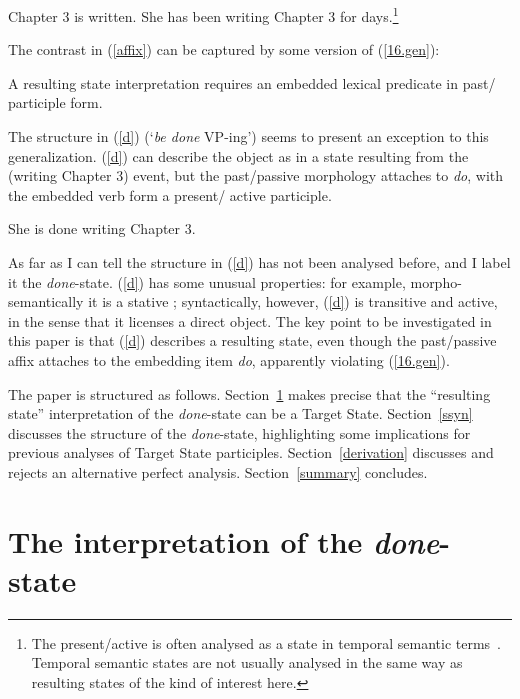 \documentclass[output=paper,modfonts,nonflat]{langsci/langscibook}
\begin{document}
\begin{exe}
\ex\label{affix}
    \begin{xlist}
    \ex Chapter 3 is written.
    \ex She has been writing Chapter 3 for days.\footnote{The present/active is often analysed as a state in temporal semantic terms~\citep[e.g.\ ][]{Parsons1990a}. Temporal semantic states are not usually analysed in the same way as resulting states of the kind of interest here.}
    \end{xlist}
\end{exe}

The contrast in (\ref{affix}) can be captured by some version of (\ref{16.gen}):

\begin{exe}
\ex\label{16.gen}  A resulting state interpretation requires an embedded lexical predicate in past/  participle form.
\end{exe}

The structure in (\ref{d}) (`\emph{be done} VP-ing') seems to present an
exception to this generalization. (\ref{d}) can describe the object as in a
state resulting from the (writing Chapter 3) event, but the past/passive
morphology attaches to \emph{do}, with the embedded verb form a present/ active
participle.

\begin{exe}
\ex\label{d} She is done writing Chapter 3.
\end{exe}

As far as I can tell the structure in (\ref{d})  has not been analysed before,
and I label it the \emph{done}-state. (\ref{d}) has some unusual properties:
for example, morpho-semantically it is a stative ; syntactically,
however, (\ref{d}) is transitive and active, in the sense that it licenses a
direct object. The key point to be investigated in this paper is that (\ref{d})
describes a resulting state, even though the past/passive affix attaches to the
embedding item \emph{do}, apparently violating (\ref{16.gen}).

The paper is structured as follows. Section~\ref{ssem} makes precise that the
\enquote{resulting state} interpretation of the \emph{done}-state can be a
Target State. Section~\ref{ssyn} discusses the structure of the
\emph{done}-state, highlighting some implications for previous analyses of
Target State participles. Section~\ref{derivation} discusses and rejects an
alternative perfect analysis. Section~\ref{summary} concludes.

\section{The interpretation of the \emph{done}-state}\label{ssem}
\end{document}
